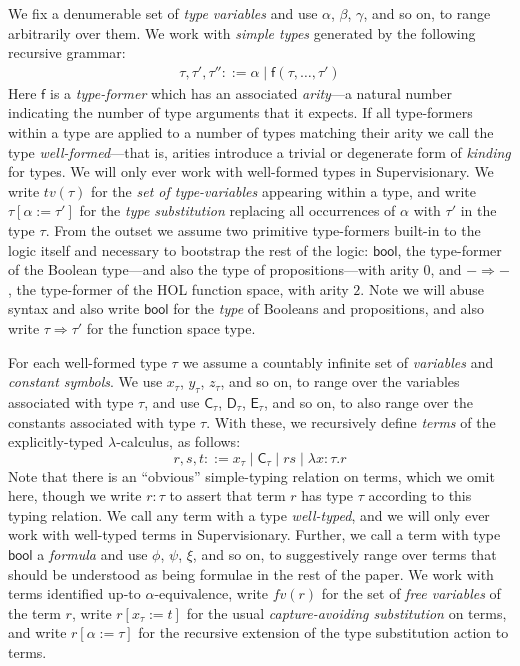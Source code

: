 \documentclass[a4paper, UKenglish, cleveref, autoref, thm-restate, colorlinks]{lipics-v2021}
\newcommand{\lam}[1]{\lambda{#1}.}
\begin{document}
We fix a denumerable set of \emph{type variables} and use $\alpha$, $\beta$, $\gamma$, and so on, to range arbitrarily over them.
We work with \emph{simple types} generated by the following recursive grammar:
\begin{gather*}
\tau, \tau', \tau'' ::= \alpha \mid \mathsf{f}(\tau, \ldots, \tau')
\end{gather*}
Here $\mathsf{f}$ is a \emph{type-former} which has an associated \emph{arity}---a natural number indicating the number of type arguments that it expects.
If all type-formers within a type are applied to a number of types matching their arity we call the type \emph{well-formed}---that is, arities introduce a trivial or degenerate form of \emph{kinding} for types.
We will only ever work with well-formed types in Supervisionary.
We write $tv(\tau)$ for the \emph{set of type-variables} appearing within a type, and write $\tau[\alpha := \tau']$ for the \emph{type substitution} replacing all occurrences of $\alpha$ with $\tau'$ in the type $\tau$.
From the outset we assume two primitive type-formers built-in to the logic itself and necessary to bootstrap the rest of the logic: $\mathsf{bool}$, the type-former of the Boolean type---and also the type of propositions---with arity $0$, and $- \Rightarrow -$, the type-former of the HOL function space, with arity $2$.
Note we will abuse syntax and also write $\mathsf{bool}$ for the \emph{type} of Booleans and propositions, and also write $\tau \Rightarrow \tau'$ for the function space type.

For each well-formed type $\tau$ we assume a countably infinite set of \emph{variables} and \emph{constant symbols}.
We use $x_\tau$, $y_\tau$, $z_\tau$, and so on, to range over the variables associated with type $\tau$, and use $\mathsf{C}_\tau$, $\mathsf{D}_\tau$, $\mathsf{E}_\tau$, and so on, to also range over the constants associated with type $\tau$.
With these, we recursively define \emph{terms} of the explicitly-typed $\lambda$-calculus, as follows:
\begin{displaymath}
r, s, t ::= x_\tau \mid \mathsf{C}_\tau \mid rs \mid \lam{x{:}\tau}r
\end{displaymath}
Note that there is an ``obvious'' simple-typing relation on terms, which we omit here, though we write $r : \tau$ to assert that term $r$ has type $\tau$ according to this typing relation.
We call any term with a type \emph{well-typed}, and we will only ever work with well-typed terms in Supervisionary.
Further, we call a term with type $\mathsf{bool}$ a \emph{formula} and use $\phi$, $\psi$, $\xi$, and so on, to suggestively range over terms that should be understood as being formulae in the rest of the paper.
We work with terms identified up-to $\alpha$-equivalence, write $fv(r)$ for the set of \emph{free variables} of the term $r$, write $r[x_\tau := t]$ for the usual \emph{capture-avoiding substitution} on terms, and write $r[\alpha := \tau]$ for the recursive extension of the type substitution action to terms.
\end{document}
